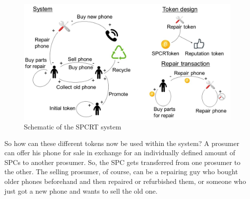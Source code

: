 \documentclass[11pt]{scrartcl}
\begin{document}
\begin{figure}
    \includegraphics[width=\textwidth]{img/cycles.jpeg}
    \caption{Schematic of the SPCRT system}%
    \label{fig:cycles}
\end{figure}

So how can these different tokens now be used within the system? A prosumer can offer his phone for sale in exchange for an individually defined amount of SPCs to another prosumer. So, the SPC gets transferred from one prosumer to the other. The selling prosumer, of course, can be a repairing guy who bought older phones beforehand and then repaired or refurbished them, or someone who just got a new phone and wants to sell the old one.
\end{document}
